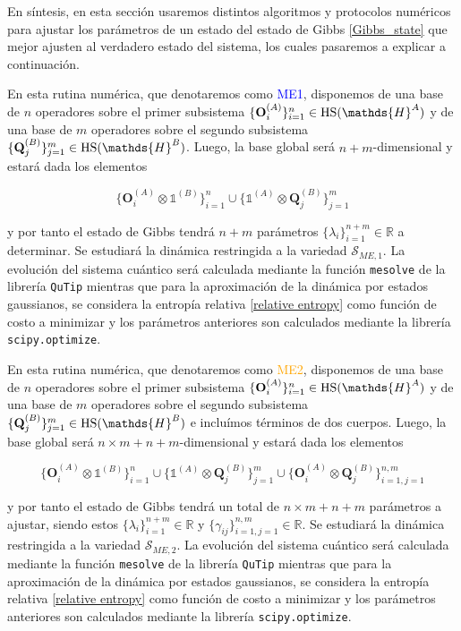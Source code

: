 \documentclass{report} %
\numberwithin{equation}{section}
\begin{document}
En síntesis, en esta sección usaremos distintos algoritmos y protocolos numéricos para ajustar los parámetros de un estado del estado de Gibbs \eqref{Gibbs_state} que mejor ajusten al verdadero estado del sistema, los cuales pasaremos a explicar a continuación.

\begin{tcolorbox}[title= Max-Ent de un cuerpo]
    En esta rutina numérica, que denotaremos como \textcolor{blue}{ME1}, disponemos de una base de $n$ operadores sobre el primer subsistema $\{\mathbf{O}_i^{(A)}\}_{i=1}^{n}\in \textnormal{HS}(\mathds{H}^{A})$ y de una base de $m$ operadores sobre el segundo subsistema $\{\mathbf{Q}_j^{(B)}\}_{j=1}^{m} \in \textnormal{HS}(\mathds{H}^{B})$. Luego, la base global será $n+m$-dimensional y estará dada los elementos
    
    $$
    \{\mathbf{O}_i^{(A)} \otimes \mathds{1}^{(B)}\}_{i=1}^{n} \cup \{\mathds{1}^{(A)} \otimes \mathbf{Q}_j^{(B)}\}_{j=1}^{m}
    $$
    
    y por tanto el estado de Gibbs tendrá $n+m$ parámetros $\{\lambda_{i}\}_{i=1}^{n+m} \in \mathds{R}$ a determinar. Se estudiará la dinámica restringida a la variedad $\mathcal{S}_{ME,1}$. La evolución del sistema cuántico será calculada mediante la función \texttt{mesolve} de la librería \texttt{QuTip} mientras que para la aproximación de la dinámica por estados gaussianos, se considera la entropía relativa \eqref{relative entropy} como función de costo a minimizar y los parámetros anteriores son calculados mediante la librería \texttt{scipy.optimize}. 
    
    \end{tcolorbox} \begin{tcolorbox}[title= Max-Ent de dos cuerpos] 
    En esta rutina numérica, que denotaremos como \textcolor{orange}{ME2}, disponemos de una base de $n$ operadores sobre el primer subsistema $\{\mathbf{O}_i^{(A)}\}_{i=1}^{n}\in \textnormal{HS}(\mathds{H}^{A})$ y de una base de $m$ operadores sobre el segundo subsistema $\{\mathbf{Q}_j^{(B)}\}_{j=1}^{m} \in \textnormal{HS}(\mathds{H}^{B})$ e incluímos términos de dos cuerpos. Luego, la base global será $n\times m+n+m$-dimensional y estará dada los elementos
    
    $$
    \{\mathbf{O}_i^{(A)} \otimes \mathds{1}^{(B)}\}_{i=1}^{n} \cup \{\mathds{1}^{(A)} \otimes \mathbf{Q}_j^{(B)}\}_{j=1}^{m} \cup \{\mathbf{O}_i^{(A)} \otimes \mathbf{Q}_j^{(B)}\}_{i=1, j=1}^{n,m}
    $$
    
    y por tanto el estado de Gibbs tendrá un total de $n \times m + n + m$ parámetros a ajustar, siendo estos $\{\lambda_{i}\}_{i=1}^{n+m} \in \mathds{R}$ y $\{\gamma_{ij}\}_{i=1,j=1}^{n,m} \in \mathds{R}$. Se estudiará la dinámica restringida a la variedad $\mathcal{S}_{ME,2}$. La evolución del sistema cuántico será calculada mediante la función \texttt{mesolve} de la librería \texttt{QuTip} mientras que para la aproximación de la dinámica por estados gaussianos, se considera la entropía relativa \eqref{relative entropy} como función de costo a minimizar y los parámetros anteriores son calculados mediante la librería \texttt{scipy.optimize}.
    \end{tcolorbox}
\end{document}
